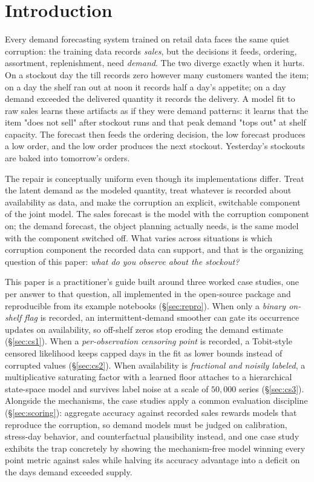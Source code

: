 \section{Introduction}\label{sec:intro}

Every demand forecasting system trained on retail data faces the same quiet corruption: the training data records \emph{sales}, but the decisions it feeds, ordering, assortment, replenishment, need \emph{demand}. The two diverge exactly when it hurts. On a stockout day the till records zero however many customers wanted the item; on a day the shelf ran out at noon it records half a day's appetite; on a day demand exceeded the delivered quantity it records the delivery. A model fit to raw sales learns these artifacts as if they were demand patterns: it learns that the item "does not sell" after stockout runs and that peak demand "tops out" at shelf capacity. The forecast then feeds the ordering decision, the low forecast produces a low order, and the low order produces the next stockout. Yesterday's stockouts are baked into tomorrow's orders.

The repair is conceptually uniform even though its implementations differ. Treat the latent demand as the modeled quantity, treat whatever is recorded about availability as data, and make the corruption an explicit, switchable component of the joint model. The sales forecast is the model with the corruption component on; the demand forecast, the object planning actually needs, is the same model with the component switched off. What varies across situations is which corruption component the recorded data can support, and that is the organizing question of this paper: \emph{what do you observe about the stockout?}

This paper is a practitioner's guide built around three worked case studies, one per answer to that question, all implemented in the open-source  package and reproducible from its example notebooks (\S\ref{sec:repro}). When only a \emph{binary on-shelf flag} is recorded, an intermittent-demand smoother can gate its occurrence updates on availability, so off-shelf zeros stop eroding the demand estimate (\S\ref{sec:cs1}). When a \emph{per-observation censoring point} is recorded, a Tobit-style censored likelihood keeps capped days in the fit as lower bounds instead of corrupted values (\S\ref{sec:cs2}). When availability is \emph{fractional and noisily labeled}, a multiplicative saturating factor with a learned floor attaches to a hierarchical state-space model and survives label noise at a scale of $50{,}000$ series (\S\ref{sec:cs3}). Alongside the mechanisms, the case studies apply a common evaluation discipline (\S\ref{sec:scoring}): aggregate accuracy against recorded sales rewards models that reproduce the corruption, so demand models must be judged on calibration, stress-day behavior, and counterfactual plausibility instead, and one case study exhibits the trap concretely by showing the mechanism-free model winning every point metric against sales while halving its accuracy advantage into a deficit on the days demand exceeded supply.

